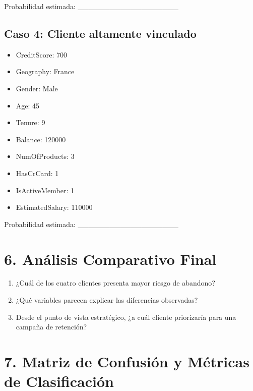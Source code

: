\documentclass[
]{article}
\providecommand{\tightlist}{%
  \setlength{\itemsep}{0pt}\setlength{\parskip}{0pt}}
\begin{document}
Probabilidad estimada: \_\_\_\_\_\_\_\_\_\_\_\_\_\_\_\_\_\_\_

\subsection{Caso 4: Cliente altamente
vinculado}\label{caso-4-cliente-altamente-vinculado}

\begin{itemize}
\tightlist
\item
  CreditScore: 700\\
\item
  Geography: France\\
\item
  Gender: Male\\
\item
  Age: 45\\
\item
  Tenure: 9\\
\item
  Balance: 120000\\
\item
  NumOfProducts: 3\\
\item
  HasCrCard: 1\\
\item
  IsActiveMember: 1\\
\item
  EstimatedSalary: 110000
\end{itemize}

Probabilidad estimada: \_\_\_\_\_\_\_\_\_\_\_\_\_\_\_\_\_\_\_

\section{6. Análisis Comparativo
Final}\label{anuxe1lisis-comparativo-final}

\begin{enumerate}
\def\labelenumi{\arabic{enumi}.}
\setcounter{enumi}{10}
\item
  ¿Cuál de los cuatro clientes presenta mayor riesgo de abandono?
\item
  ¿Qué variables parecen explicar las diferencias observadas?
\item
  Desde el punto de vista estratégico, ¿a cuál cliente priorizaría para
  una campaña de retención?
\end{enumerate}

\section{7. Matriz de Confusión y Métricas de
Clasificación}\label{matriz-de-confusiuxf3n-y-muxe9tricas-de-clasificaciuxf3n}
\end{document}
